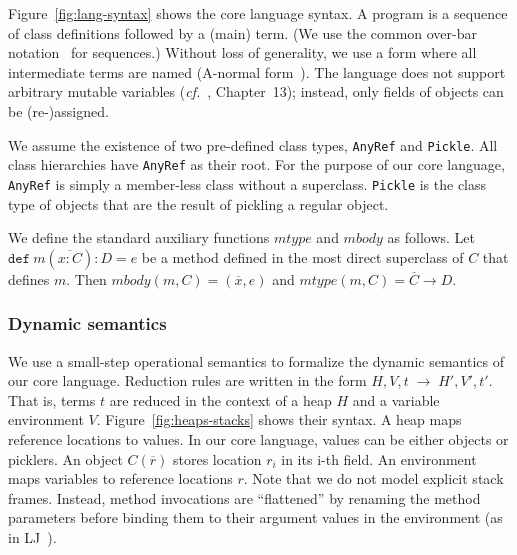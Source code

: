 \documentclass[preprint,10pt]{sigplanconf}
\theoremstyle{definition}
\theoremstyle{definition}
\newcommand{\ba}{\begin{array}}
\newcommand{\ea}{\end{array}}
\newcommand{\typ}{:}
\newcommand{\seq}[1]{\overline{#1}}
\newcommand{\sreduce}[6]{#1, #2, #3 \;\longrightarrow\; #4, #5, #6}
\begin{document}
Figure~\ref{fig:lang-syntax} shows the core language syntax. A program is a
sequence of class definitions followed by a (main) term. (We use the common
over-bar notation~\cite{Igarashi2001} for sequences.) Without loss of
generality, we use a form where all intermediate terms are named (A-normal
form~\cite{Flanagan93}). The language does not support arbitrary mutable
variables ({\em cf.}~\cite{TAPL}, Chapter~13); instead, only fields of objects
can be (re-)assigned.

We assume the existence of two pre-defined class types, \verb|AnyRef| and
\verb|Pickle|. All class hierarchies have \verb|AnyRef| as their root. For the
purpose of our core language, \verb|AnyRef| is simply a member-less class
without a superclass. \verb|Pickle| is the class type of objects that are the
result of pickling a regular object.

We define the standard auxiliary functions $mtype$ and $mbody$ as follows.
Let $\texttt{def}~m(\seq{x \typ C}) \typ D = e$ be a method defined in the
most direct superclass of $C$ that defines $m$. Then
$mbody(m, C) = (\seq{x}, e)$ and $mtype(m, C) = \seq{C} \rightarrow D$.

\vspace{0em}
\subsubsection{Dynamic semantics}


We use a small-step operational semantics to formalize the dynamic semantics
of our core language. Reduction rules are written in the form
$\sreduce H V t {H'} {V'} {t'}$. That is, terms $t$ are reduced in the context of
a heap $H$ and a variable environment $V$.
Figure~\ref{fig:heaps-stacks} shows their syntax. A
heap maps reference locations to values. In our core language, values can be
either objects or picklers. An object
$C(\seq{r})$ stores location $r_i$ in its i-th field. An environment maps
variables to reference locations $r$. Note that
we do not model explicit stack frames. Instead, method invocations are
``flattened'' by renaming the method parameters before binding them to
their argument values in the environment (as in LJ~\cite{StrnisaSP07}).
\end{document}
